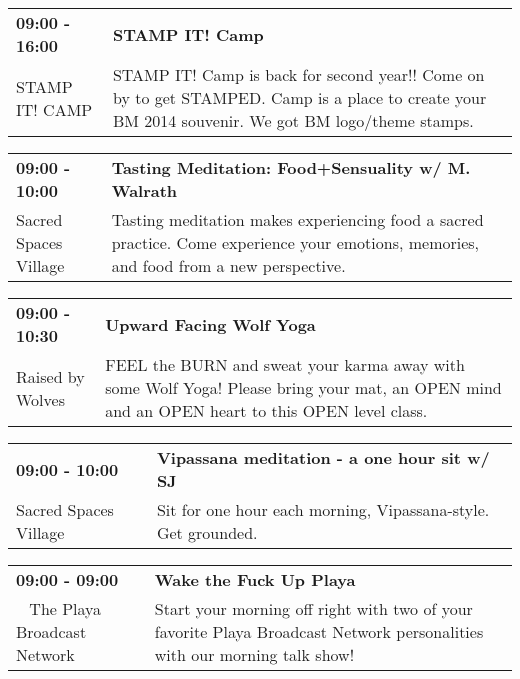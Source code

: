 \begin{tabular}{ p{1in} p{2.2in} }
    \textbf{09:00 - 16:00} & \textbf{STAMP IT! Camp} \\
    STAMP IT! CAMP \newline  & STAMP IT! Camp is back for second year!! Come on by to get STAMPED. Camp is a place to create your BM 2014 souvenir. We got BM logo/theme stamps. \\
    \hline 
\end{tabular}
    
\begin{tabular}{ p{1in} p{2.2in} }
    \textbf{09:00 - 10:00} & \textbf{Tasting Meditation: Food+Sensuality w/ M. Walrath} \\
    Sacred Spaces Village \newline  & Tasting meditation makes experiencing food a sacred practice. Come experience your emotions, memories, and food from a new perspective. \\
    \hline 
\end{tabular}
    
\begin{tabular}{ p{1in} p{2.2in} }
    \textbf{09:00 - 10:30} & \textbf{Upward Facing Wolf Yoga} \\
    Raised by Wolves \newline  & FEEL the BURN and sweat your karma away with some Wolf Yoga! Please bring your mat, an OPEN mind and an OPEN heart to this OPEN level class. \\
    \hline 
\end{tabular}
    
\begin{tabular}{ p{1in} p{2.2in} }
    \textbf{09:00 - 10:00} & \textbf{Vipassana meditation - a one hour sit w/ SJ} \\
    Sacred Spaces Village \newline  & Sit for one hour each morning, Vipassana-style. Get grounded. \\
    \hline 
\end{tabular}
    
\begin{tabular}{ p{1in} p{2.2in} }
    \textbf{09:00 - 09:00} & \textbf{Wake the Fuck Up Playa} \\
    ~ \newline The Playa Broadcast Network & Start your morning off right with two of your favorite Playa Broadcast Network personalities with our morning talk show! \\
    \hline 
\end{tabular}
    
